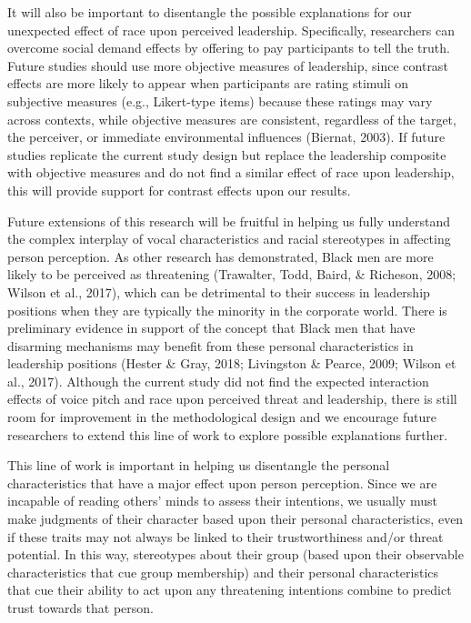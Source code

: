 \documentclass[
  english,
  man]{apa6}
\begin{document}
It will also be important to disentangle the possible explanations for our unexpected effect of race upon perceived leadership. Specifically, researchers can overcome social demand effects by offering to pay participants to tell the truth. Future studies should use more objective measures of leadership, since contrast effects are more likely to appear when participants are rating stimuli on subjective measures (e.g., Likert-type items) because these ratings may vary across contexts, while objective measures are consistent, regardless of the target, the perceiver, or immediate environmental influences (Biernat, 2003). If future studies replicate the current study design but replace the leadership composite with objective measures and do not find a similar effect of race upon leadership, this will provide support for contrast effects upon our results.

Future extensions of this research will be fruitful in helping us fully understand the complex interplay of vocal characteristics and racial stereotypes in affecting person perception. As other research has demonstrated, Black men are more likely to be perceived as threatening (Trawalter, Todd, Baird, \& Richeson, 2008; Wilson et al., 2017), which can be detrimental to their success in leadership positions when they are typically the minority in the corporate world. There is preliminary evidence in support of the concept that Black men that have disarming mechanisms may benefit from these personal characteristics in leadership positions (Hester \& Gray, 2018; Livingston \& Pearce, 2009; Wilson et al., 2017). Although the current study did not find the expected interaction effects of voice pitch and race upon perceived threat and leadership, there is still room for improvement in the methodological design and we encourage future researchers to extend this line of work to explore possible explanations further.

This line of work is important in helping us disentangle the personal characteristics that have a major effect upon person perception. Since we are incapable of reading others' minds to assess their intentions, we usually must make judgments of their character based upon their personal characteristics, even if these traits may not always be linked to their trustworthiness and/or threat potential. In this way, stereotypes about their group (based upon their observable characteristics that cue group membership) and their personal characteristics that cue their ability to act upon any threatening intentions combine to predict trust towards that person.
\end{document}
